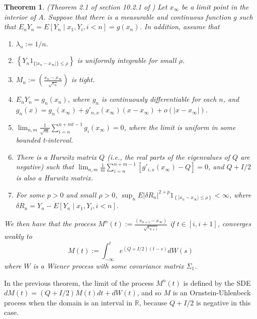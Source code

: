 \documentclass{wscpaperproc}
\theoremstyle{wsc}
\newtheorem{theorem}{Theorem}
\begin{document}
\begin{theorem} 
(Theorem 2.1 of section 10.2.1 of ) 
Let $x_{\infty}$ be a limit point in the interior of $A$. Suppose that there is a measurable and continuous function $g$ such that $E_{n}Y_{n}=E\left[Y_{n}\mid x_{1},Y_{i},i<n\right]=g\left(x_{n}\right)$. In addition, assume that 

\begin{enumerate}
\item $\lambda_{n}:=1/n$.
\item $\left\{ Y_{n}1_{\{\left|x_{n}-x_{\infty}\right|\}\leq\rho}\right\}$ is uniformly integrable for small $\rho$.
\item $M_{n}:=\left(\frac{x_{n}-x_{\infty}}{\sqrt{\epsilon_{n}}}\right)$ is tight.
\item $E_{n}Y_{n}=g_{n}\left(x_{n}\right)$, where $g_{n}$ is continuously differentiable for each $n$, and $g_{n}\left(x\right)=g_{n}\left(x_{\infty}\right)+g'_{n,x}\left(x_{\infty}\right)\left(x-x_{\infty}\right)+o\left(\left|x-x_{\infty}\right|\right)$.
\item $\lim_{n,m}\frac{1}{\sqrt{m}}\sum_{i=n}^{n+mt-1}g_{i}\left(x_{\infty}\right)=0$, where the limit is uniform in some bounded t-interval.
\item There is a Hurwitz matrix $Q$ (i.e., the real parts of the eigenvalues of $Q$ are negative) such that $\lim_{n,m}\frac{1}{m}\sum_{i=n}^{n+m-1}\left[g'_{i,x}\left(x_{\infty}\right)-Q\right]=0$, and $Q+I/2$ is also a Hurwitz matrix.
\item For some $p>0$ and small $\rho>0$, $\sup_{n}E\left|\delta R_{n}\right|^{2+p}1_{\left\{ \left|x_{n}-x_{\infty}\right|\leq\rho\right\} }<\infty$, where $\delta R_{n}=Y_{n}-E\left[Y_{n}\mid x_{1},Y_{i},i<n\right]$.
\end{enumerate}

We then have that the process $M^{n}\left(t\right):=\frac{\left(x_{n+i}-x_{\infty}\right)}{\sqrt{\epsilon_{n+i}}}$ if $t\in \left[i,i+1\right]$, converges weakly to 
\[
M\left(t\right):=\int_{-\infty}^{t}e^{\left(Q+I/2\right)\left(t-s\right)}dW\left(s\right)
\]
where $W$ is a Wiener process with some covariance matrix $\Sigma_{1}$.
\end{theorem}

In the previous theorem, the limit of the process $M^{n}\left(t\right)$ is defined by the SDE $dM(t)=(Q+I/2)M(t)dt+dW(t)$, and so $M$ is an Ornstein-Uhlenbeck process when the domain is an interval in $\mathbb{R}$, because $Q+I/2$ is negative in this case.
\end{document}
